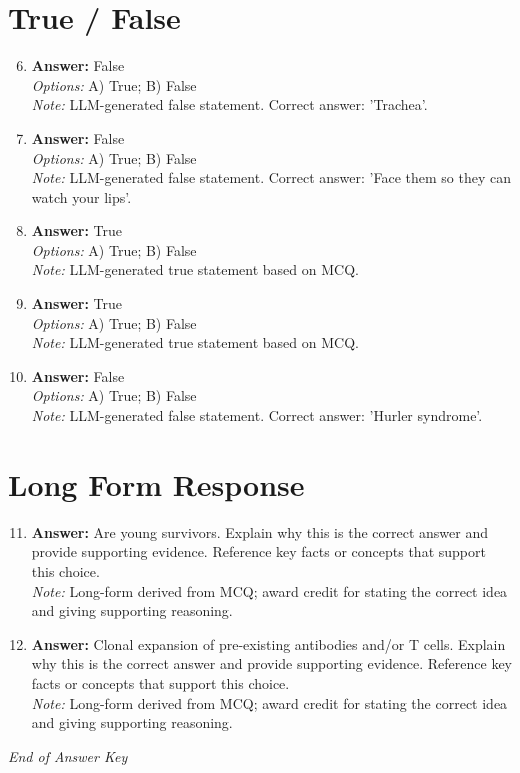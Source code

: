 \documentclass[12pt]{article}
\begin{document}
\section*{True / False}
\begin{enumerate}[label=\arabic*.]
\setcounter{enumi}{5}
\item \textbf{Answer:} False
\\ \textit{Options:} A) True; B) False
\\ \textit{Note:} LLM-generated false statement. Correct answer: 'Trachea'.
\item \textbf{Answer:} False
\\ \textit{Options:} A) True; B) False
\\ \textit{Note:} LLM-generated false statement. Correct answer: 'Face them so they can watch your lips'.
\item \textbf{Answer:} True
\\ \textit{Options:} A) True; B) False
\\ \textit{Note:} LLM-generated true statement based on MCQ.
\item \textbf{Answer:} True
\\ \textit{Options:} A) True; B) False
\\ \textit{Note:} LLM-generated true statement based on MCQ.
\item \textbf{Answer:} False
\\ \textit{Options:} A) True; B) False
\\ \textit{Note:} LLM-generated false statement. Correct answer: 'Hurler syndrome'.
\end{enumerate}

\section*{Long Form Response}
\begin{enumerate}[label=\arabic*.]
\setcounter{enumi}{10}
\item \textbf{Answer:} Are young survivors. Explain why this is the correct answer and provide supporting evidence. Reference key facts or concepts that support this choice.
\\ \textit{Note:} Long-form derived from MCQ; award credit for stating the correct idea and giving supporting reasoning.
\item \textbf{Answer:} Clonal expansion of pre-existing antibodies and/or T cells. Explain why this is the correct answer and provide supporting evidence. Reference key facts or concepts that support this choice.
\\ \textit{Note:} Long-form derived from MCQ; award credit for stating the correct idea and giving supporting reasoning.
\end{enumerate}

\vfill
\noindent\textit{End of Answer Key}
\end{document}

